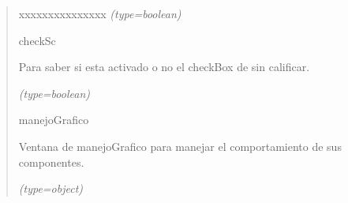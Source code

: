 \begin{boxedminipage}{\funcwidth}
\begin{quote}
\begin{Ventry}{xxxxxxxxxxxxxxx}
            {\it (type=boolean)}

          \item[checkSc]

          Para saber si esta activado o no el checkBox de sin calificar.

            {\it (type=boolean)}

          \item[manejoGrafico]

          Ventana de manejoGrafico para manejar el comportamiento de sus 
          componentes.

            {\it (type=object)}

        \end{Ventry}

      \end{quote}

    \end{boxedminipage}

